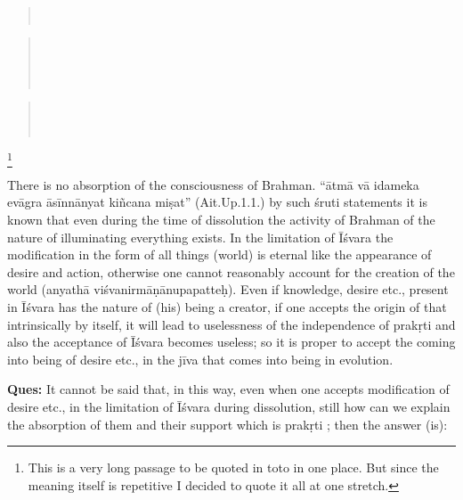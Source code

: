 \begin{verse}
\\
\end{verse}
\begin{verse}
\\
\\
\\
\end{verse}
\begin{verse}
\\
\\
\end{verse}
\footnote{This is a very long passage to be quoted in toto in one place. But since the meaning itself is repetitive I decided to quote it all at one stretch.}

There is no absorption of the consciousness of Brahman. “ātmā vā idameka evāgra āsīnnānyat kiñcana miṣat” (Ait.Up.1.1.) by such śruti statements it is known that even during the time of dissolution the activity of Brahman of the nature of illuminating everything exists. In the limitation of Īśvara the modification in the form of all things (world) is eternal like the appearance of desire and action, otherwise one cannot reasonably account for the creation of the world (anyathā viśvanirmāṇānupapatteḥ). Even if knowledge, desire etc., present in Īśvara has the nature of (his) being a creator, if one accepts the origin of that intrinsically by itself, it will lead to uselessness of the independence of prakṛti and also the acceptance of Īśvara becomes useless; so it is proper to accept the coming into being of desire etc., in the jīva that comes into being in evolution.

\textbf{Ques:} It cannot be said that, in this way, even when one accepts modification of desire etc., in the limitation of Īśvara during dissolution, still how can we explain the absorption of them and their support which is prakṛti ; then the answer  (is): 

